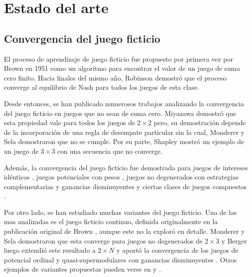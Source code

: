\chapter{Estado del arte}  \label{cap:relwork}

\section{Convergencia del juego ficticio}

El proceso de aprendizaje de juego ficticio fue propuesto por primera vez por Brown en 1951 \cite{brown:1951} como un algoritmo para encontrar el valor de un juego de suma cero finito. Hacia finales del mismo año, Robinson \cite{robinson:zerosum} demostró que el proceso converge al equilibrio de Nash para todos los juegos de esta clase.

Desde entonces, se han publicado numerosos trabajos analizando la convergencia del juego ficticio en juegos que no sean de suma cero. Miyazawa \cite{miyazawa:2x2} demostró que esta propiedad vale para todos los juegos de $2 \times 2$ pero, su demostración depende de la incorporación de una regla de desempate particular sin la cual, Monderer y Sela \cite{2x2:without} demostraron que no se cumple. Por su parte, Shapley \cite{shapley:3x3} mostró un ejemplo de un juego de $3 \times 3$ con una secuencia que no converge.

Además, la convergencia del juego ficticio fue demostrada para juegos de intereses idénticos \cite{identical:interests}, juegos potenciales con pesos \cite{weighted:potential}, juegos no degenerados con estrategias complementarias y ganancias disminuyentes \cite{strategic:complementarities} y ciertas clases de juegos compuestos \cite{compound}.

Por otro lado, se han estudiado muchas variantes del juego ficticio. Una de las mas analizadas es el juego ficticio continuo, definida originalmente en la publicación original de Brown \cite{brown:1951}, aunque este no la exploró en detalle. Monderer y Sela demostraron que esta converge para juegos no degenerados de $2 \times 3$ \cite{no:cycling} y Berger luego extendió este resultado a $2 \times N$ \cite{berger:2xn} y aportó la convergencia de los juegos de potencial ordinal y quasi-supermodulares con ganancias disminuyentes \cite{berger:two}. Otros ejemplos de variantes propuestas pueden verse en \cite{pattern:recog} y \cite{new:kind:fp}.

